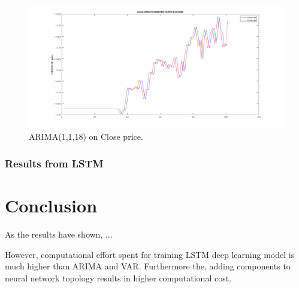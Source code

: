 \documentclass[11pt]{article}
\begin{document}
\begin{figure}[H]
  \centering
  \includegraphics[width=\linewidth,keepaspectratio]{figs/var20close100.png}
  \caption{ARIMA(1,1,18) on Close price.}
\end{figure}

\subsubsection{Results from LSTM}
\section{Conclusion}
As the results have shown, ...

However, computational effort spent for training LSTM deep learning model is
much higher than ARIMA and VAR. Furthermore the, adding components to neural network
topology results in higher computational cost. 

\pagebreak


\end{document}
